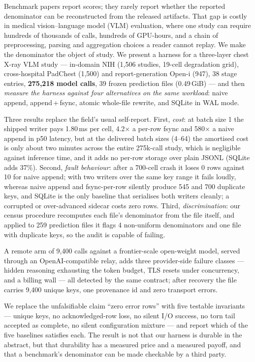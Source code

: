 Benchmark papers report scores; they rarely report whether the reported denominator can be reconstructed from the released artifacts. That gap is costly in medical vision--language model (VLM) evaluation, where one study can require hundreds of thousands of calls, hundreds of GPU-hours, and a chain of preprocessing, parsing and aggregation choices a reader cannot replay. We make the denominator the object of study. We present a harness for a three-layer chest X-ray VLM study --- in-domain NIH (1,506 studies, 19-cell degradation grid), cross-hospital PadChest (1,500) and report-generation Open-i (947), 38 stage entries, \textbf{275,218 model calls}, 39 frozen prediction files (0.49\,GiB) --- and then \emph{measure the harness against four alternatives on the same workload}: naive append, append\,+\,fsync, atomic whole-file rewrite, and SQLite in WAL mode.

Three results replace the field's usual self-report. First, \emph{cost}: at batch size 1 the shipped writer pays 1.80\,ms per cell, 4.2$\times$ a per-row fsync and 580$\times$ a naive append in p50 latency, but at the delivered batch sizes (4--64) the amortised cost is only about two minutes across the entire 275k-call study, which is negligible against inference time, and it adds no per-row storage over plain JSONL (SQLite adds 37\%). Second, \emph{fault behaviour}: after a 700-cell crash it loses 0 rows against 10 for naive append; with two writers over the same key range it fails loudly, whereas naive append and fsync-per-row silently produce 545 and 700 duplicate keys, and SQLite is the only baseline that serialises both writers cleanly; a corrupted or over-advanced sidecar costs zero rows. Third, \emph{discrimination}: our census procedure recomputes each file's denominator from the file itself, and applied to 259 prediction files it flags 4 non-uniform denominators and one file with duplicate keys, so the audit is capable of failing.

A remote arm of 9,400 calls against a frontier-scale open-weight model, served through an OpenAI-compatible relay, adds three provider-side failure classes --- hidden reasoning exhausting the token budget, TLS resets under concurrency, and a billing wall --- all detected by the same contract; after recovery the file carries 9,400 unique keys, one provenance id and zero transport errors.

We replace the unfalsifiable claim ``zero error rows'' with five testable invariants --- unique keys, no acknowledged-row loss, no silent I/O success, no torn tail accepted as complete, no silent configuration mixture --- and report which of the five baselines satisfies each. The result is not that our harness is durable in the abstract, but that durability has a measured price and a measured payoff, and that a benchmark's denominator can be made checkable by a third party.
